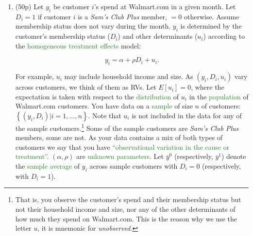 \documentclass{article}
\begin{document}
\begin{enumerate}[label=\textbf{Q\arabic{enumi}}.,ref=Q\arabic{enumi}, wide=0pt, itemsep=1em, topsep=5pt]

    \newpage
    \item (50p) Let $y_{i}$ be customer $i$'s spend at Walmart.com in a given month. Let $D_{i}=1$ if customer $i$ is a \textit{Sam's Club Plus} member, $=0$ otherwise. Assume membership status does not vary during the month. $y_{i}$ is determined by the customer's membership status ($D_{i}$) and other determinants ($u_{i}$) according to the \textcolor{ForestGreen}{homogeneous treatment effects} model:\label{item:q1}

    \begin{equation} \label{model_1}
    y_{i}=\alpha +\rho D_{i}+u_{i}.
    \end{equation}

    For example, $u_{i}$ may include household income and size. As $\left( y_{i},D_{i},u _{i}\right) $ vary across customers, we think of them as RVs. Let $E\left[ u_{i}\right] =0$, where the expectation is taken with respect to the \textcolor{ForestGreen}{distribution} of $u_{i}$ in the \textcolor{ForestGreen}{population} of Walmart.com customers. You have data on a \textcolor{ForestGreen}{sample} of size $n$ of customers: $\left\{ \left( y_{i},D_{i}\right) |i=1,\ldots,n\right\} $. Note that $u_{i}$ is not included in the data for any of the sample customers.\footnote{That is, you observe the customer's spend and their membership status but not their household income and size, nor any of the other determinants of how much they spend on Walmart.com. This is the reason why we use the letter $u$, it is mnemonic for \textit{unobserved}.} Some of the sample customers are \textit{Sam's Club Plus} members, some are not. As your data contains a mix of both types of customers we say that you  have \textcolor{ForestGreen}{``observational variation in the cause or treatment''}. $\left( \alpha ,\rho \right) $ are \textcolor{ForestGreen}{unknown parameters}. Let $\overline{y}^{0}$ (respectively, $\overline{y}^{1}$) denote the \textcolor{ForestGreen}{sample average} of $y_{i}$ across sample customers with $D_{i}=0$ (respectively, with $D_{i}=1$).


\end{enumerate}
\end{document}

